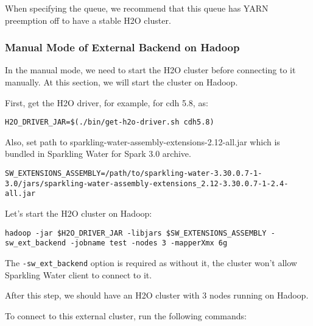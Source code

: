 When specifying the queue, we recommend that this queue has YARN preemption off to have a stable H2O cluster.

\subsubsection{Manual Mode of External Backend on Hadoop}

In the manual mode, we need to start the H2O cluster before connecting to it manually. At this section, we
will start the cluster on Hadoop.

First, get the H2O driver, for example, for cdh 5.8, as:

\begin{lstlisting}[style=bash]
H2O_DRIVER_JAR=$(./bin/get-h2o-driver.sh cdh5.8)
\end{lstlisting}

Also, set path to sparkling-water-assembly-extensions-2.12-all.jar which is bundled in Sparkling Water for Spark 3.0 archive.

\begin{lstlisting}[style=bash]
SW_EXTENSIONS_ASSEMBLY=/path/to/sparkling-water-3.30.0.7-1-3.0/jars/sparkling-water-assembly-extensions_2.12-3.30.0.7-1-2.4-all.jar
\end{lstlisting}

Let's start the H2O cluster on Hadoop:

\begin{lstlisting}[style=bash]
hadoop -jar $H2O_DRIVER_JAR -libjars $SW_EXTENSIONS_ASSEMBLY -sw_ext_backend -jobname test -nodes 3 -mapperXmx 6g
\end{lstlisting}

The \texttt{-sw\_ext\_backend} option is required as without it, the cluster won't allow Sparkling Water client to connect to it.

After this step, we should have an H2O cluster with 3 nodes running on Hadoop.

To connect to this external cluster, run the following commands:

